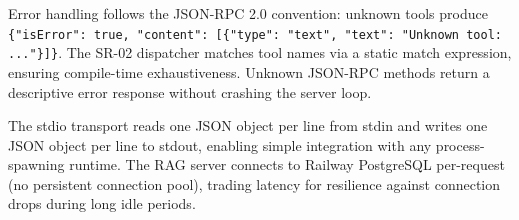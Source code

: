 Error handling follows the JSON-RPC 2.0 convention: unknown tools produce \texttt{\{"isError": true, "content": [\{"type": "text", "text": "Unknown tool: ..."\}]\}}. The SR-02 dispatcher matches tool names via a static match expression, ensuring compile-time exhaustiveness. Unknown JSON-RPC methods return a descriptive error response without crashing the server loop.

The stdio transport reads one JSON object per line from stdin and writes one JSON object per line to stdout, enabling simple integration with any process-spawning runtime. The RAG server connects to Railway PostgreSQL per-request (no persistent connection pool), trading latency for resilience against connection drops during long idle periods.


